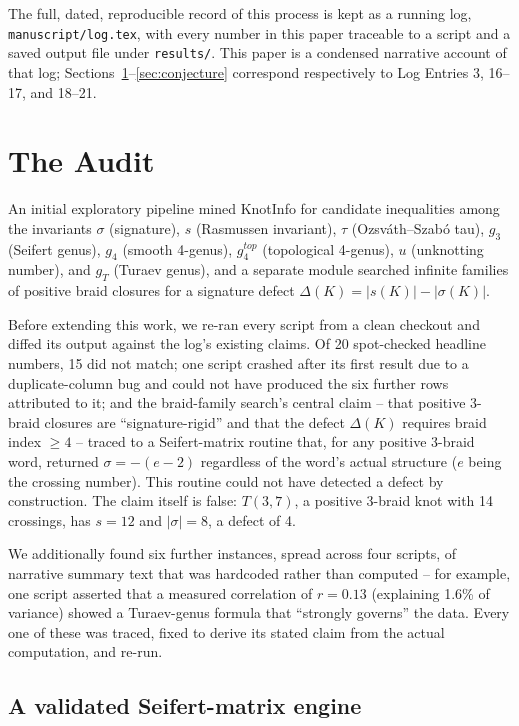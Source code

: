 \documentclass[11pt]{article}
\theoremstyle{definition}
\begin{document}
The full, dated, reproducible record of this process is kept as a running log, \texttt{manuscript/log.tex}, with every number in this paper traceable to a script and a saved output file under \texttt{results/}. This paper is a condensed narrative account of that log; Sections~\ref{sec:audit}--\ref{sec:conjecture} correspond respectively to Log Entries 3, 16--17, and 18--21.

\section{The Audit}
\label{sec:audit}

An initial exploratory pipeline mined KnotInfo for candidate inequalities among the invariants $\sigma$ (signature), $s$ (Rasmussen invariant), $\tau$ (Ozsv\'ath--Szab\'o tau), $g_3$ (Seifert genus), $g_4$ (smooth 4-genus), $g_4^{top}$ (topological 4-genus), $u$ (unknotting number), and $g_T$ (Turaev genus), and a separate module searched infinite families of positive braid closures for a signature defect $\Delta(K) = |s(K)| - |\sigma(K)|$.

Before extending this work, we re-ran every script from a clean checkout and diffed its output against the log's existing claims. Of 20 spot-checked headline numbers, 15 did not match; one script crashed after its first result due to a duplicate-column bug and could not have produced the six further rows attributed to it; and the braid-family search's central claim -- that positive 3-braid closures are ``signature-rigid'' and that the defect $\Delta(K)$ requires braid index $\geq 4$ -- traced to a Seifert-matrix routine that, for any positive 3-braid word, returned $\sigma = -(e-2)$ regardless of the word's actual structure ($e$ being the crossing number). This routine could not have detected a defect by construction. The claim itself is false: $T(3,7)$, a positive 3-braid knot with 14 crossings, has $s=12$ and $|\sigma|=8$, a defect of 4.

We additionally found six further instances, spread across four scripts, of narrative summary text that was hardcoded rather than computed -- for example, one script asserted that a measured correlation of $r=0.13$ (explaining 1.6\% of variance) showed a Turaev-genus formula that ``strongly governs'' the data. Every one of these was traced, fixed to derive its stated claim from the actual computation, and re-run.

\subsection{A validated Seifert-matrix engine}
\end{document}
